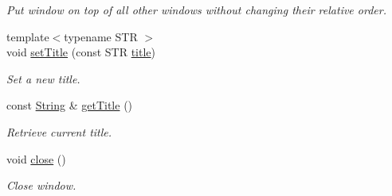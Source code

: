 \begin{DoxyCompactItemize}
\begin{DoxyCompactList}\small\item\em Put window on top of all other windows without changing their relative order. \end{DoxyCompactList}\item 
\hypertarget{classGUI_1_1ToplevelWindow_a4d93f63b50e5096fd914fedd942c02de}{{\footnotesize template$<$typename S\-T\-R $>$ }\\void \hyperlink{classGUI_1_1ToplevelWindow_a4d93f63b50e5096fd914fedd942c02de}{set\-Title} (const S\-T\-R \hyperlink{classGUI_1_1ToplevelWindow_a04de191f9a57b5b584657866a4ac6843}{title})}\label{classGUI_1_1ToplevelWindow_a4d93f63b50e5096fd914fedd942c02de}

\begin{DoxyCompactList}\small\item\em Set a new title. \end{DoxyCompactList}\item 
\hypertarget{classGUI_1_1ToplevelWindow_af55cdeb0526c4fb69427582b83716cb0}{const \hyperlink{classGUI_1_1String}{String} \& \hyperlink{classGUI_1_1ToplevelWindow_af55cdeb0526c4fb69427582b83716cb0}{get\-Title} ()}\label{classGUI_1_1ToplevelWindow_af55cdeb0526c4fb69427582b83716cb0}

\begin{DoxyCompactList}\small\item\em Retrieve current title. \end{DoxyCompactList}\item 
\hypertarget{classGUI_1_1ToplevelWindow_a9216f525296f9fd4a4c7a0663ee4d1c5}{void \hyperlink{classGUI_1_1ToplevelWindow_a9216f525296f9fd4a4c7a0663ee4d1c5}{close} ()}\label{classGUI_1_1ToplevelWindow_a9216f525296f9fd4a4c7a0663ee4d1c5}

\begin{DoxyCompactList}\small\item\em Close window. \end{DoxyCompactList}\end{DoxyCompactItemize}
